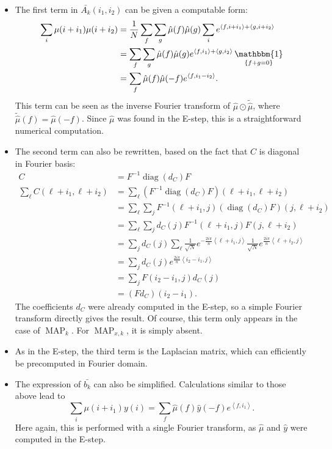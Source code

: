 \documentclass[english,a4paper]{article}
\theoremstyle{plain}
\theoremstyle{definition}
\theoremstyle{remark}
\newcommand{\scal}[2]{\left\langle #1 , #2 \right\rangle}
\DeclareMathOperator{\One}{\mathbbm{1}}
\DeclareMathOperator{\diag}{diag}
\DeclareMathOperator{\MAP}{MAP}
\begin{document}
\begin{itemize}
	\item The first term in $\bar{A_k}(i_1,i_2)$ can be given a computable form:
\begin{align*}
\sum_i \mu(i+i_1)\mu(i+i_2) &= \frac{1}{N} \sum_f \sum_g \hat{\mu}(f) \hat{\mu}(g) \sum_i  e^{\scal{f}{i+i_1} + \scal{g}{i+i_2}}\\
&=\sum_f \sum_g \hat{\mu}(f) \hat{\mu}(g) e^{\scal{f}{i_1}+\scal{g}{i_2}}  \One_{\{f+g=0\}}\\
&= \sum_f \hat{\mu}(f) \hat{\mu}(-f) e^{\scal{f}{i_1-i_2}} .
\end{align*}
This term can be seen as the inverse Fourier transform of $\hat{\mu} \odot \tilde{\hat{\mu}}$, where $\tilde{\hat{\mu}}(f) = \hat{\mu}(-f)$. Since $\hat{\mu}$ was found in the E-step, this is a straightforward numerical computation.

	\item The second term can also be rewritten, based on the fact that $C$ is diagonal in Fourier basis:
\begin{align*}
C &= F^{-1} \diag(d_C) F\\
\sum_\ell C(\ell+i_1,\ell+i_2) 
&= \sum_\ell (F^{-1} \diag(d_C) F)(\ell+i_1,\ell+i_2)\\
&= \sum_\ell \sum_j F^{-1}(\ell+i_1,j) (\diag(d_C) F)(j,\ell+i_2)\\
&= \sum_\ell \sum_j d_C(j) F^{-1}(\ell+i_1,j) F(j,\ell+i_2)\\
&= \sum_j d_C(j)  \sum_\ell \frac{1}{\sqrt{N}} e^{-\frac{2i\pi}{n} \scal{\ell+i_1}{j}} \frac{1}{\sqrt{N}} e^{\frac{2i\pi}{n} \scal{\ell+i_2}{j}}\\
&= \sum_j d_C(j) e^{\frac{2i\pi}{n} \scal{i_2-i_1}{j}}\\
&= \sum_j F(i_2-i_1,j) d_C(j)\\
&= (F d_C)(i_2-i_1) .
\end{align*}
The coefficients $d_C$ were already computed in the E-step, so a simple Fourier transform directly gives the result.
Of course, this term only appears in the case of $\MAP_k$. For $\MAP_{x,k}$, it is simply absent.

	\item As in the E-step, the third term is the Laplacian matrix, which can efficiently be precomputed in Fourier domain.
	
	\item The expression of $\bar{b_k}$ can also be simplified. Calculations similar to those above lead to
	\begin{equation}\label{eq:b_k_fourier}
	\sum_i \mu(i+i_1) y(i) = \sum_f \hat{\mu}(f) \hat{y}(-f) e^{\scal{f}{i_1}} .
	\end{equation}
	Here again, this is performed with a single Fourier transform, as $\hat{\mu}$ and $\hat{y}$ were computed in the E-step.
\end{itemize}
\end{document}
